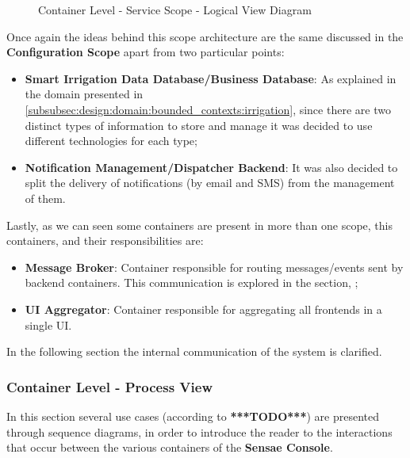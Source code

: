\begin{figure}[H]
   \centering
   \resizebox{\columnwidth}{!}
   {      
      
   }
   \caption[Container Level - Service Scope - Logical View Diagram]{Container Level - Service Scope - Logical View Diagram}
   \label{fig:design:architecture:container:logical:diagram:service}
\end{figure}

Once again the ideas behind this scope architecture are the same discussed in the \textbf{Configuration Scope} apart from two particular points:

\begin{itemize}
   \item \textbf{Smart Irrigation Data Database/Business Database}: As explained in the domain presented in \ref{subsubsec:design:domain:bounded_contexts:irrigation}, since there are two distinct types of information to store and manage it was decided to use different technologies for each type;
   \item \textbf{Notification Management/Dispatcher Backend}: It was also decided to split the delivery of notifications (by email and SMS) from the management of them. 
\end{itemize}

Lastly, as we can seen some containers are present in more than one scope, this containers, and their responsibilities are:

\begin{itemize}
   \item \textbf{Message Broker}: Container responsible for routing messages/events sent by backend containers. This communication is explored in the section, ;
   \item \textbf{UI Aggregator}: Container responsible for aggregating all frontends in a single \gls{UI}.
\end{itemize}

In the following section the internal communication of the system is clarified.

\subsubsection*{Container Level - Process View}
\label{subsubsec:design:architecture:container:process}

In this section several use cases (according to \textbf{***TODO***}) are presented through sequence diagrams, in order to introduce the reader to the interactions that occur between the various containers of the \textbf{Sensae Console}. 

